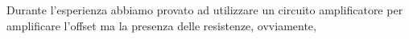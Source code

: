 Durante l'esperienza abbiamo provato ad utilizzare un circuito amplificatore per amplificare l'offset ma la presenza delle resistenze, ovviamente, 
























































































